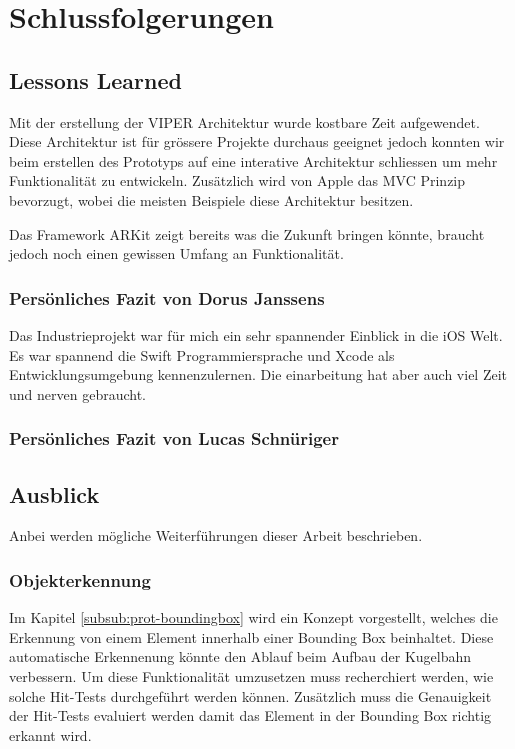 \section{Schlussfolgerungen}

\subsection{Lessons Learned}
Mit der erstellung der VIPER Architektur wurde kostbare Zeit aufgewendet. Diese Architektur ist für grössere Projekte durchaus geeignet jedoch konnten wir beim erstellen des Prototyps auf eine interative Architektur schliessen um mehr Funktionalität zu entwickeln. Zusätzlich wird von Apple das MVC Prinzip bevorzugt, wobei die meisten Beispiele diese Architektur besitzen.

Das Framework ARKit zeigt bereits was die Zukunft bringen könnte, braucht jedoch noch einen gewissen Umfang an Funktionalität.

\subsubsection{Persönliches Fazit von Dorus Janssens}
Das Industrieprojekt war für mich ein sehr spannender Einblick in die iOS Welt. Es war spannend die Swift Programmiersprache und Xcode als Entwicklungsumgebung kennenzulernen. Die einarbeitung hat aber auch viel Zeit und nerven gebraucht. 

\subsubsection{Persönliches Fazit von Lucas Schnüriger}


\subsection{Ausblick}

Anbei werden mögliche Weiterführungen dieser Arbeit beschrieben.

\subsubsection{Objekterkennung}
Im Kapitel \ref{subsub:prot-boundingbox} wird ein Konzept vorgestellt, welches die Erkennung von einem Element innerhalb einer Bounding Box beinhaltet. Diese automatische Erkennenung könnte den Ablauf beim Aufbau der Kugelbahn verbessern. Um diese Funktionalität umzusetzen muss recherchiert werden, wie solche Hit-Tests durchgeführt werden können. Zusätzlich muss die Genauigkeit der Hit-Tests evaluiert werden damit das Element in der Bounding Box richtig erkannt wird.

